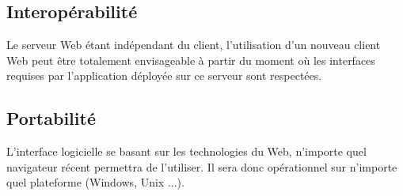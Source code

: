 	\subsection{Interopérabilité}
	Le serveur Web étant indépendant du client, l'utilisation d'un nouveau client Web peut être totalement envisageable à partir du moment où les interfaces requises par l'application déployée sur ce serveur sont respectées.

	\subsection{Portabilité}
	L'interface logicielle se basant sur les technologies du Web, n'importe quel navigateur récent permettra de l'utiliser. Il sera donc opérationnel sur n'importe quel plateforme (Windows, Unix ...).
	





